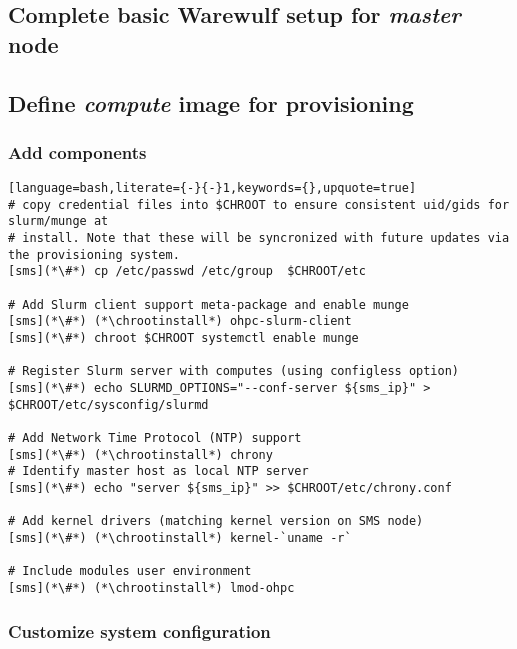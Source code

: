 \documentclass[letterpaper]{article}
\newcommand{\chrootinstall}{yum -y --installroot=\$CHROOT install}
\begin{document}
\vspace*{-0.15cm}
\subsection{Complete basic Warewulf setup for {\em master} node} \label{sec:setup_ww}




\subsection{Define {\em compute} image for provisioning}


\subsubsection{Add \OHPC{} components} \label{sec:add_components}


\begin{lstlisting}[language=bash,literate={-}{-}1,keywords={},upquote=true]
# copy credential files into $CHROOT to ensure consistent uid/gids for slurm/munge at
# install. Note that these will be syncronized with future updates via the provisioning system.
[sms](*\#*) cp /etc/passwd /etc/group  $CHROOT/etc

# Add Slurm client support meta-package and enable munge
[sms](*\#*) (*\chrootinstall*) ohpc-slurm-client
[sms](*\#*) chroot $CHROOT systemctl enable munge

# Register Slurm server with computes (using configless option)
[sms](*\#*) echo SLURMD_OPTIONS="--conf-server ${sms_ip}" > $CHROOT/etc/sysconfig/slurmd

# Add Network Time Protocol (NTP) support
[sms](*\#*) (*\chrootinstall*) chrony
# Identify master host as local NTP server
[sms](*\#*) echo "server ${sms_ip}" >> $CHROOT/etc/chrony.conf

# Add kernel drivers (matching kernel version on SMS node)
[sms](*\#*) (*\chrootinstall*) kernel-`uname -r`

# Include modules user environment
[sms](*\#*) (*\chrootinstall*) lmod-ohpc
\end{lstlisting}

\subsubsection{Customize system configuration} \label{sec:master_customization}

\end{document}
